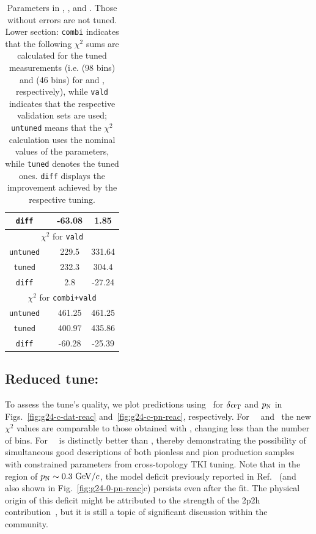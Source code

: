 \begin{table}[!htb]
\begin{tabular}{cccc}
    \texttt{diff}            & & -63.08         & 1.85         \\
    \hline
    \multicolumn{4}{c}{$\chi^2$ \textrm{for} \texttt{vald}} \\
    \hline
    \texttt{untuned}    & & 229.5          & 331.64        \\
    \texttt{tuned}            & & 232.3    & 304.4         \\
    \texttt{diff}       & & 2.8          & -27.24        \\
    \hline
    \multicolumn{4}{c}{$\chi^2$ \textrm{for} \texttt{combi+vald}} \\
    \hline
    \texttt{untuned}    & &  461.25          &  461.25        \\
    \texttt{tuned}          &  & 400.97 & 435.86        \\
    \texttt{diff} & & -60.28         & -25.39  \\     
    \hline
    \hline
\end{tabular}
\caption{\label{tab:restunes}
	Parameters in \gZero, \gC, and \gT. Those without errors are not tuned. Lower section: \texttt{combi} indicates that the following $\chi^2$ sums are calculated for the tuned measurements (i.e. \cbRedPar (98 bins) and \cbAllPar (46 bins) for \gC and \gT, respectively), while \texttt{vald} indicates that the respective validation sets are used; \texttt{untuned} means that the $\chi^2$ calculation uses the nominal values of the parameters, while \texttt{tuned} denotes the tuned ones. \texttt{diff} displays the improvement achieved by the respective tuning.  
}
\end{table}


\subsection{Reduced tune: \gC}

To assess the tune's quality, we plot predictions using \gC\ for $\delta\alpha_\textrm{T}$ and $p_\textrm{N}$ in Figs.~\ref{fig:g24-c-dat-reac} and~\ref{fig:g24-c-pn-reac},  respectively. For \ttkzpi\, \ttkpip\ and \minzpi\, the new $\chi^2$ values are comparable to those obtained with \gZero, changing less than the number of bins. For \minpiz\, \gC\ is distinctly better than \gZero, thereby demonstrating the possibility of simultaneous good descriptions of both pionless and pion production samples with constrained parameters from cross-topology TKI tuning. Note that in the region of $p_\textrm{N}\sim0.3~\textrm{GeV}/c$, the model deficit previously reported in Ref.~\cite{MINERvA:2018hba} (and also shown in Fig.~\ref{fig:g24-0-pn-reac}c) persists even after the fit. The physical origin of this deficit might be attributed to the strength of the 2p2h contribution~\cite{MINERvA:2018hba}, but it is still a topic of significant discussion within the community.

